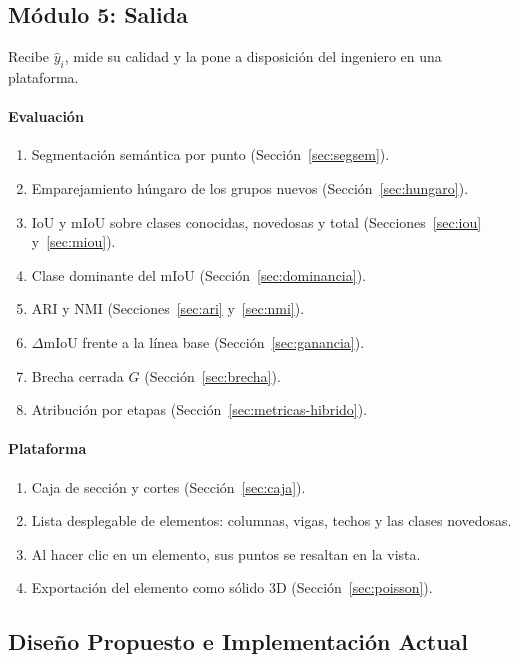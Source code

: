 \subsection{Módulo 5: Salida}
\label{sec:modulo5}

Recibe $\hat{y}_i$, mide su calidad y la pone a disposición del ingeniero en una
plataforma.

\paragraph*{Evaluación}
\begin{enumerate}\setlength{\itemsep}{1pt}
\item Segmentación semántica por punto (Sección~\ref{sec:segsem}).
\item Emparejamiento húngaro de los grupos nuevos
(Sección~\ref{sec:hungaro}).
\item IoU y mIoU sobre clases conocidas, novedosas y total
(Secciones~\ref{sec:iou} y~\ref{sec:miou}).
\item Clase dominante del mIoU (Sección~\ref{sec:dominancia}).
\item ARI y NMI (Secciones~\ref{sec:ari} y~\ref{sec:nmi}).
\item $\Delta$mIoU frente a la línea base (Sección~\ref{sec:ganancia}).
\item Brecha cerrada $G$ (Sección~\ref{sec:brecha}).
\item Atribución por etapas (Sección~\ref{sec:metricas-hibrido}).
\end{enumerate}

\paragraph*{Plataforma}
\begin{enumerate}\setlength{\itemsep}{1pt}\setcounter{enumi}{8}
\item Caja de sección y cortes (Sección~\ref{sec:caja}).
\item Lista desplegable de elementos: columnas, vigas, techos y las clases
novedosas.
\item Al hacer clic en un elemento, sus puntos se resaltan en la vista.
\item Exportación del elemento como sólido 3D (Sección~\ref{sec:poisson}).
\end{enumerate}

\subsection{Diseño Propuesto e Implementación Actual}
\label{sec:estado-impl}

